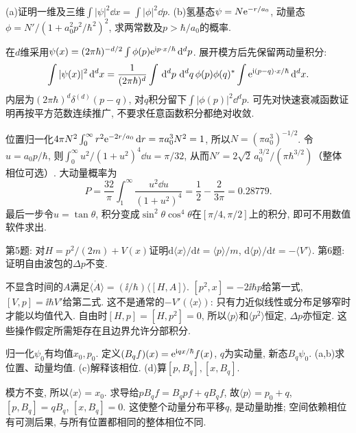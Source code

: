 \begin{exercise}
(a)证明一维及三维$\int|\psi|^2\dd x=\int|\phi|^2\dd p$. (b)氢基态$\psi=N\mathrm e^{-r/a_0}$, 动量态$\phi=N'/(1+a_0^2p^2/\hbar^2)^2$, 求两常数及$p>\hbar/a_0$的概率.
\end{exercise}
\begin{solution}
在$d$维采用$\psi(x)=(2\pi\hbar)^{-d/2}\int\phi(p)\mathrm e^{\mathrm i p\cdot x/\hbar}\,\mathrm d^dp$. 展开模方后先保留两动量积分:
\[
\int|\psi(x)|^2\,\mathrm d^dx=\frac1{(2\pi\hbar)^d}\int\,\mathrm d^dp\,\,\mathrm d^dq\,\phi(p)\phi(q)^*\int\mathrm e^{\mathrm i(p-q)\cdot x/\hbar}\,\mathrm d^dx.
\]
内层为$(2\pi\hbar)^d\delta^{(d)}(p-q)$, 对$q$积分留下$\int|\phi(p)|^2\dd^dp$. 可先对快速衰减函数证明再按平方范数连续推广, 不要求任意函数积分都绝对收敛.

位置归一化$4\pi N^2\int_0^\infty r^2\mathrm e^{-2r/a_0}\,\mathrm d r=\pi a_0^3N^2=1$, 所以$N=(\pi a_0^3)^{-1/2}$. 令$u=a_0p/\hbar$, 则$\int_0^\infty u^2/(1+u^2)^4\dd u=\pi/32$, 从而$N'=2\sqrt2\,a_0^{3/2}/(\pi\hbar^{3/2})$（整体相位可选）. 大动量概率为
\[
P=\frac{32}{\pi}\int_1^\infty\frac{u^2\dd u}{(1+u^2)^4}=\frac12-\frac2{3\pi}=0.28779.
\]
最后一步令$u=\tan\theta$, 积分变成$\sin^2\theta\cos^4\theta$在$[\pi/4,\pi/2]$上的积分, 即可不用数值软件求出.
\end{solution}
\begin{exercise}
第5题: 对$H=p^2/(2m)+V(x)$证明$\mathrm d\langle x\rangle/\mathrm dt=\langle p\rangle/m$, $\mathrm d\langle p\rangle/\mathrm dt=-\langle V'\rangle$. 第6题: 证明自由波包的$\Delta p$不变.
\end{exercise}
\begin{solution}
不显含时间的$A$满足$\dot{\langle A\rangle}=(\ii/\hbar)\langle[H,A]\rangle$. $[p^2,x]=-2\ii\hbar p$给第一式, $[V,p]=\ii\hbar V'$给第二式. 这不是通常的$-V'(\langle x\rangle)$: 只有力近似线性或分布足够窄时才能以均值代入. 自由时$[H,p]=[H,p^2]=0$, 所以$\langle p\rangle$和$\langle p^2\rangle$恒定, $\Delta p$亦恒定. 这些操作假定所需矩存在且边界允许分部积分.
\end{solution}
\begin{exercise}
归一化$\psi_0$有均值$x_0,p_0$. 定义$(B_qf)(x)=\mathrm e^{\mathrm i qx/\hbar}f(x)$, $q$为实动量, 新态$B_q\psi_0$. (a,b)求位置、动量均值. (c)解释该相位. (d)算$[p,B_q],[x,B_q]$.
\end{exercise}
\begin{solution}
模方不变, 所以$\langle x\rangle=x_0$. 求导给$pB_qf=B_qpf+qB_qf$, 故$\langle p\rangle=p_0+q$, $[p,B_q]=qB_q$, $[x,B_q]=0$. 这使整个动量分布平移$q$, 是动量助推; 空间依赖相位有可测后果, 与所有位置都相同的整体相位不同.
\end{solution}

